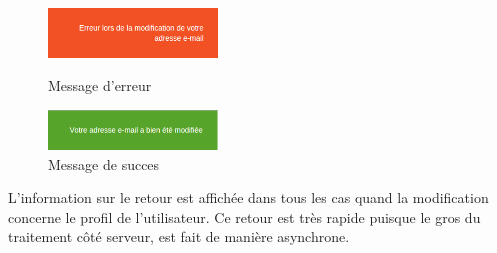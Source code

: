 \begin{figure}[h]
  \begin{center}
    \includegraphics[width=0.4\textwidth]{Pictures/implementation/capsule_orange.png}
    \caption{Message d'erreur}
    \vspace{1em}
    \includegraphics[width=0.4\textwidth]{Pictures/implementation/capsule_verte.png}
    \caption{Message de succes}
  \end{center}
\end{figure}
L'information sur le retour est affichée dans tous les cas quand la modification concerne le profil de l'utilisateur.
Ce retour est très rapide puisque le gros du traitement côté serveur, est fait de manière asynchrone.
